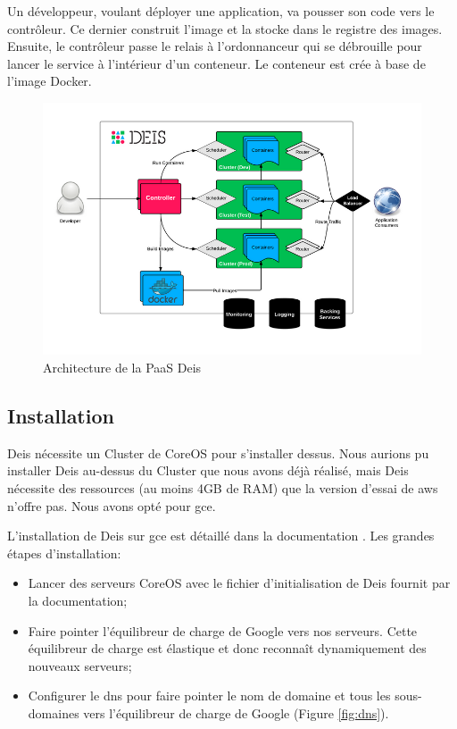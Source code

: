 \begin{onehalfspace}
Un développeur, voulant déployer une application, va pousser son code vers le contrôleur. Ce dernier construit l'image et la stocke dans le registre des images. Ensuite, le contrôleur passe le relais à l'ordonnanceur qui se débrouille pour lancer le service à l'intérieur d'un conteneur. Le conteneur est crée à base de l'image Docker.



\begin{figure}[H]
\centering
\includegraphics [scale=0.6]{chapitre5/assets/deis-architecture}
\caption{Architecture de la PaaS Deis}
\label{fig:deis-architecture}
\end{figure}


\subsection{Installation}


Deis nécessite un Cluster de CoreOS pour s'installer dessus. Nous aurions pu installer Deis au-dessus du Cluster que nous avons déjà réalisé, mais Deis nécessite des ressources (au moins 4GB de RAM) que la version d’essai de \acrshort{aws} n'offre pas. Nous avons opté pour \acrshort{gce}.

L'installation de Deis sur \acrshort{gce} est détaillé dans la documentation \cite{deis-gce}. Les grandes étapes d'installation:
\begin{itemize}
	\item Lancer des serveurs CoreOS avec le fichier d'initialisation de Deis fournit par la documentation;
	\item Faire pointer l'équilibreur de charge de Google vers nos serveurs. Cette équilibreur de charge est élastique et donc reconnaît dynamiquement des nouveaux serveurs;
	\item Configurer le \acrshort{dns} pour faire pointer le nom de domaine et tous les sous-domaines vers l'équilibreur de charge de Google (Figure \ref{fig:dns}).
\end{itemize}


\end{onehalfspace}
